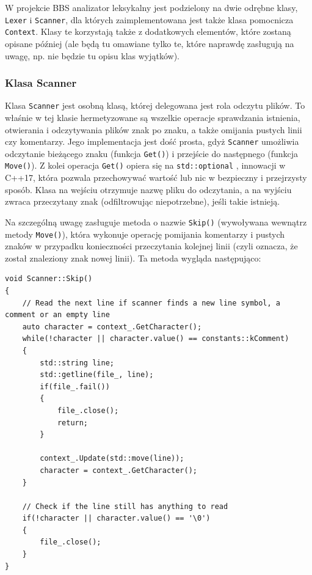 W projekcie BBS analizator leksykalny jest podzielony na dwie odrębne klasy, \texttt{Lexer} i \texttt{Scanner}, dla których zaimplementowana jest także klasa pomocnicza \texttt{Context}. Klasy te korzystają także z dodatkowych elementów, które zostaną opisane później (ale będą tu omawiane tylko te, które naprawdę zasługują na uwagę, np. nie będzie tu opisu klas wyjątków).

\subsubsection{Klasa Scanner}
Klasa \texttt{Scanner} jest osobną klasą, której delegowana jest rola odczytu plików. To właśnie w tej klasie hermetyzowane są wszelkie operacje sprawdzania istnienia, otwierania i odczytywania plików znak po znaku, a także omijania pustych linii czy komentarzy. Jego implementacja jest dość prosta, gdyż \texttt{Scanner} umożliwia odczytanie bieżącego znaku (funkcja \texttt{Get()}) i przejście do następnego (funkcja \texttt{Move()}). Z kolei operacja \texttt{Get()} opiera się na \texttt{std::optional} \cite{cpp_optional}, innowacji w C++17, która pozwala przechowywać wartość lub nic w bezpieczny i przejrzysty sposób. Klasa na wejściu otrzymuje nazwę pliku do odczytania, a na wyjściu zwraca przeczytany znak (odfiltrowując niepotrzebne), jeśli takie istnieją.

Na szczególną uwagę zasługuje metoda o nazwie \texttt{Skip()} (wywoływana wewnątrz metody \texttt{Move()}), która wykonuje operację pomijania komentarzy i pustych znaków w przypadku konieczności przeczytania kolejnej linii (czyli oznacza, że został znaleziony znak nowej linii). Ta metoda wygląda następująco:

\begin{lstlisting}[label=list:scanner,caption=Metoda Scanner::Skip(),basicstyle=\footnotesize\ttfamily]
void Scanner::Skip()
{
    // Read the next line if scanner finds a new line symbol, a comment or an empty line
    auto character = context_.GetCharacter();
    while(!character || character.value() == constants::kComment)
    {
        std::string line;
        std::getline(file_, line);
        if(file_.fail())
        {
            file_.close();
            return;
        }
    
        context_.Update(std::move(line));
        character = context_.GetCharacter();
    }
    
    // Check if the line still has anything to read
    if(!character || character.value() == '\0')
    {
        file_.close();
    }
}
\end{lstlisting}

